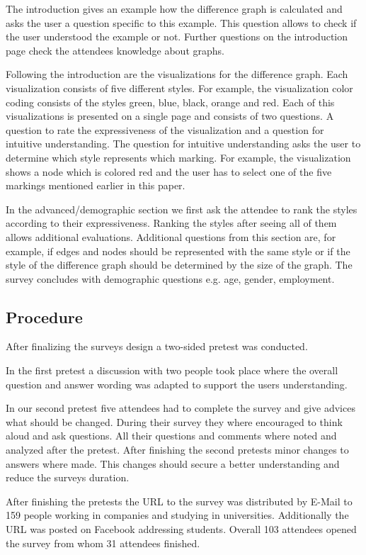 \documentclass{llncs}
\begin{document}
The introduction gives an example how the difference graph is calculated and asks the user a question specific to this example. This question allows to check if the user understood the example or not. Further questions on the introduction page check the attendees knowledge about graphs.

Following the introduction are the visualizations for the difference graph. Each visualization consists of five different styles. For example, the visualization color coding consists of the styles green, blue, black, orange and red. Each of this visualizations is presented on a single page and consists of two questions. A question to rate the expressiveness of the visualization and a question for intuitive understanding. The question for intuitive understanding asks the user to determine which style represents which marking. For example, the visualization shows a node which is colored red and the user has to select one of the five markings mentioned earlier in this paper.

In the advanced/demographic section we first ask the attendee to rank the styles according to their expressiveness. Ranking the styles after seeing all of them allows additional evaluations. Additional questions from this section are, for example, if edges and nodes should be represented with the same style or if the style of the difference graph should be determined by the size of the graph. The survey concludes with demographic questions e.g. age, gender, employment.


\subsection{Procedure} %
\label{sec:Procedure}
After finalizing the surveys design a two-sided pretest was conducted.

In the first pretest a discussion with two people took place where the overall question and answer wording was adapted to support the users understanding.

In our second pretest five attendees had to complete the survey and give advices what should be changed. During their survey they where encouraged to think aloud and ask questions. All their questions and comments where noted and analyzed after the pretest. After finishing the second pretests minor changes to answers where made. This changes should secure a better understanding and reduce the surveys duration.

After finishing the pretests the URL to the survey was distributed by E-Mail to 159 people working in companies and studying in universities. Additionally the URL was posted on Facebook addressing students. Overall 103 attendees opened the survey from whom 31 attendees finished.
\end{document}
